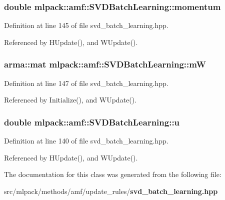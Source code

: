 \subsubsection[{momentum}]{\setlength{\rightskip}{0pt plus 5cm}double mlpack\-::amf\-::\-S\-V\-D\-Batch\-Learning\-::momentum\hspace{0.3cm}{\ttfamily [private]}}\label{classmlpack_1_1amf_1_1SVDBatchLearning_a634ccfb27e600ffc433223dcea8763a1}


Definition at line 145 of file svd\-\_\-batch\-\_\-learning.\-hpp.



Referenced by H\-Update(), and W\-Update().

\subsubsection[{m\-W}]{\setlength{\rightskip}{0pt plus 5cm}arma\-::mat mlpack\-::amf\-::\-S\-V\-D\-Batch\-Learning\-::m\-W\hspace{0.3cm}{\ttfamily [private]}}\label{classmlpack_1_1amf_1_1SVDBatchLearning_ab3e822a4685a26878119a457386e981e}


Definition at line 147 of file svd\-\_\-batch\-\_\-learning.\-hpp.



Referenced by Initialize(), and W\-Update().

\subsubsection[{u}]{\setlength{\rightskip}{0pt plus 5cm}double mlpack\-::amf\-::\-S\-V\-D\-Batch\-Learning\-::u\hspace{0.3cm}{\ttfamily [private]}}\label{classmlpack_1_1amf_1_1SVDBatchLearning_acea55e198332c16129d79bb00cc97737}


Definition at line 140 of file svd\-\_\-batch\-\_\-learning.\-hpp.



Referenced by H\-Update(), and W\-Update().



The documentation for this class was generated from the following file\-:\begin{DoxyCompactItemize}
\item 
src/mlpack/methods/amf/update\-\_\-rules/{\bf svd\-\_\-batch\-\_\-learning.\-hpp}\end{DoxyCompactItemize}
